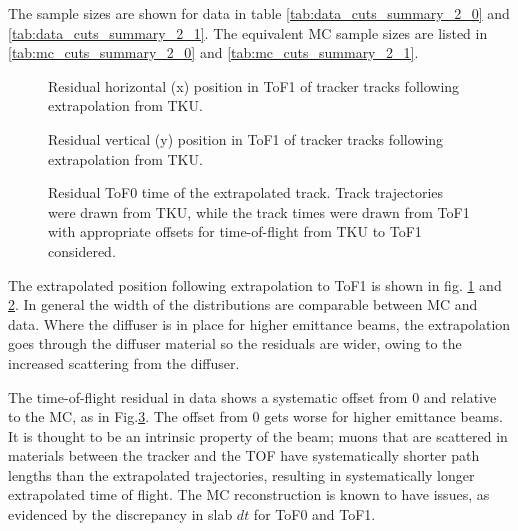 The sample sizes are shown for data in table \ref{tab:data_cuts_summary_2_0} and
\ref{tab:data_cuts_summary_2_1}. The equivalent MC sample sizes are listed in 
\ref{tab:mc_cuts_summary_2_0} and \ref{tab:mc_cuts_summary_2_1}.

\let\splitcell\undefined

\let\splitcell\undefined

\let\splitcell\undefined

\begin{figure}[!tbh]
    \centering
    {Residual horizontal (x) position in ToF1 of tracker tracks following extrapolation from TKU. \label{fig:tof1_extrapolated_x}}
\end{figure}

\begin{figure}[!tbh]
    \centering
    {Residual vertical (y) position in ToF1 of tracker tracks following extrapolation from TKU. \label{fig:tof1_extrapolated_y}}
\end{figure}

\begin{figure}[!tbh]
    \centering
    {Residual ToF0 time of the extrapolated track. Track trajectories were drawn from TKU, while the track times were
    drawn from ToF1 with appropriate offsets for time-of-flight from TKU to ToF1 considered. \label{fig:tof0_extrapolated_t}}
\end{figure}

The extrapolated position following extrapolation to ToF1 is shown in fig.
\ref{fig:tof1_extrapolated_x} and \ref{fig:tof1_extrapolated_y}. In general the width 
of the distributions are comparable between MC and data. Where the diffuser is in
place for higher emittance beams, the extrapolation goes through the diffuser
material so the residuals are wider, owing to the increased scattering from the
diffuser.

The time-of-flight residual in data shows a systematic offset from 0 and relative to the
MC, as in Fig.\ref{fig:tof0_extrapolated_t}. The offset from 0 gets worse for higher emittance beams. It is thought to be
an intrinsic property of the beam; muons that are scattered in materials between 
the tracker and the TOF have systematically shorter path lengths than the 
extrapolated trajectories, resulting in systematically longer extrapolated time
of flight. The MC reconstruction is known to have issues, as evidenced by the 
discrepancy in slab $dt$ for ToF0 and ToF1.

